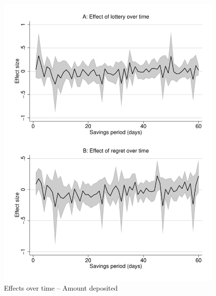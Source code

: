 \documentclass[11pt]{article}
\begin{document}
        \begin{figure}[ht]
        \centering
        \caption{Effects over time -- Amount deposited}
        \includegraphics[width=\textwidth]{../../figures/line-timemobile_depositamount.pdf}
        \end{figure}

\end{document}
